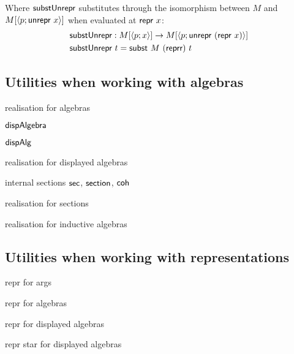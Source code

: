 Where $\textsf{substUnrepr}$ substitutes through the isomorphism between $M$ and $M[\langle p;\textsf{unrepr}\ x\rangle]$ when evaluated at $\textsf{repr}\ x$:
\begin{align*}
&\mta{substUnrepr} : M[\Msub{p; x}] \to M[\Msub{p; \mta{unrepr}\ (\mta{repr}\ x)}] \\
&\mta{substUnrepr}\ t = \mta{subst}\ M\ (\mta{reprr})\ t
\end{align*}

\subsection{Utilities when working with algebras} \label{app:algebras}

realisation for algebras

$\textsf{dispAlgebra}$

$\textsf{dispAlg}$

realisation for displayed algebras

internal sections $\textsf{sec}$, $\textsf{section}$, $\textsf{coh}$

realisation for sections

realisation for inductive algebras

\subsection{Utilities when working with representations} \label{app:reprs}

repr for args

repr for algebras

repr for displayed algebras

repr star for displayed algebras




